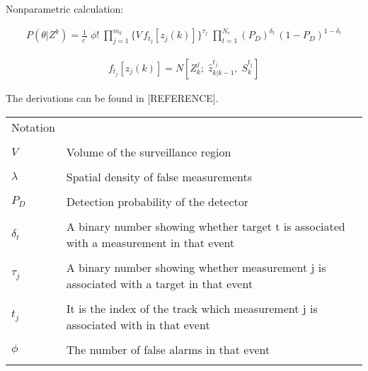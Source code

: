 \documentclass[peerreview]{IEEEtran}
\begin{document}
Nonparametric calculation:

\begin{equation}
\begin{aligned}
P(\theta|Z^k) = \frac{1}{c^{'}} \; \phi! \; \prod\limits_{j=1}^{m_k} \{ V \, f_{t_j}[z_j(k)] \} ^{\tau_j} \; \prod\limits_{t=1}^{N_r} (P_D)^{\delta_t} \, (1-P_D)^{1-\delta_t}
\end{aligned}
\end{equation}

\begin{equation}
\begin{aligned}
f_{t_j}[z_j(k)] = N[Z^j_k; \; \hat{z}^{t_j}_{k|k-1}, \; S^{t_j}_k]
\end{aligned}
\end{equation}

\vspace{5px}

The derivations can be found in [REFERENCE].

\vspace{5px}

\begin{center}

\begin{tabularx}{0.4\textwidth }{@{}p{}X@{}}
\toprule
  Notation \\ \\
  $V$ & Volume of the surveillance region \\ \\
  $\lambda$ & Spatial density of false measurements \\ \\
  $P_D$ & Detection probability of the detector \\ \\
  $\delta_t$ & A binary number showing whether target t is associated with a measurement in that event\\ \\
  $\tau_j$ & A binary number showing whether measurement j is associated with a target in that event \\ \\
  $t_j$ & It is the index of the track which measurement j is associated with in that event \\ \\
  $\phi$ & The number of false alarms in that event\\ \\
  
 
\bottomrule
\end{tabularx}

\end{center}
\end{document}
